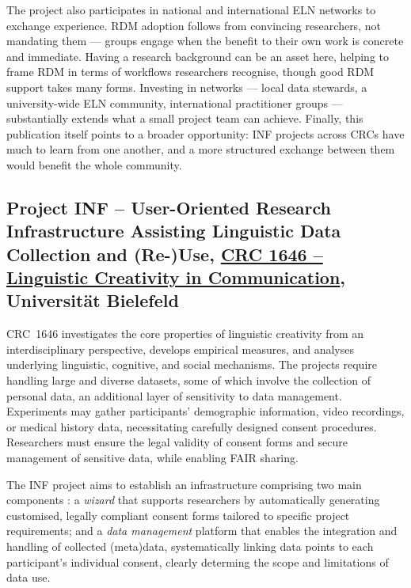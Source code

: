 \documentclass{eceasst}
\begin{document}
The project also participates in national and international ELN networks to exchange experience.
RDM adoption follows from convincing researchers, not mandating them --- groups engage when the benefit to their own work is concrete and immediate.
Having a research background can be an asset here, helping to frame RDM in terms of workflows researchers recognise, though good RDM support takes many forms.
Investing in networks --- local data stewards, a university-wide ELN community, international practitioner groups --- substantially extends what a small project team can achieve.
Finally, this publication itself points to a broader opportunity: INF projects across CRCs have much to learn from one another, and a more structured exchange between them would benefit the whole community.


\subsection{Project INF – User-Oriented Research Infrastructure Assisting Linguistic Data Collection and (Re-)Use, \href{https://purl.org/crc1646}{CRC 1646 – Linguistic Creativity in Communication}, Universität Bielefeld}

CRC~1646 investigates the core properties of linguistic creativity from an interdisciplinary perspective, develops empirical measures, and analyses underlying linguistic, cognitive, and social mechanisms. %
The projects require handling large and diverse datasets, some of which involve the collection of personal data, an additional layer of sensitivity to data management. Experiments may gather participants' demographic information, video recordings, or medical history data, necessitating carefully designed consent procedures. Researchers must ensure the legal validity of consent forms and secure management of sensitive data, while enabling FAIR sharing.

The INF project aims to establish an infrastructure comprising two main components \cite{JorschickSchrader2024}: a \textit{wizard} that supports researchers by automatically generating customised, legally compliant consent forms tailored to specific project requirements; and a \emph{data management} platform that enables the integration and handling of collected (meta)data, systematically linking data points to each participant's individual consent, clearly determing the scope and limitations of data use. 
\end{document}
